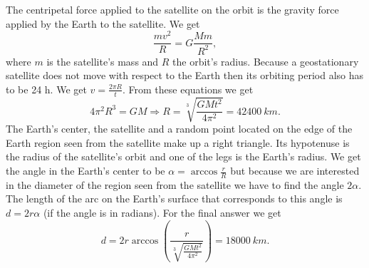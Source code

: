 \solueng
The centripetal force applied to the satellite on the orbit is the gravity force applied by the Earth to the satellite. We get 
$$\frac{mv^2}{R}=G\frac{Mm}{R^2},$$
where $m$ is the satellite’s mass and $R$ the orbit’s radius. Because a geostationary satellite does not move with respect to the Earth then its orbiting period also has to be 24 h. We get $v=\frac{2\pi R}{t}$. From these equations we get
$$4\pi^2 R^3=GM \Rightarrow R=\sqrt[3]{\frac{GMt^2}{4\pi^2}}=\SI{42400}{km}.$$
The Earth’s center, the satellite and a random point located on the edge of the Earth region seen from the satellite make up a right triangle. Its hypotenuse is the radius of the satellite’s orbit and one of the legs is the Earth’s radius. We get the angle in the Earth’s center to be $\alpha=\arccos{\frac{r}{R}}$ but because we are interested in the diameter of the region seen from the satellite we have to find the angle $2\alpha$. The length of the arc on the Earth’s surface that corresponds to this angle is $d=2r\alpha$ (if the angle is in radians). For the final answer we get
$$d=2r\arccos \left(\frac{r}{\sqrt[3]{\frac{GMt^2}{4\pi^2}}}\right) =\SI{18000}{km}.$$
\probend